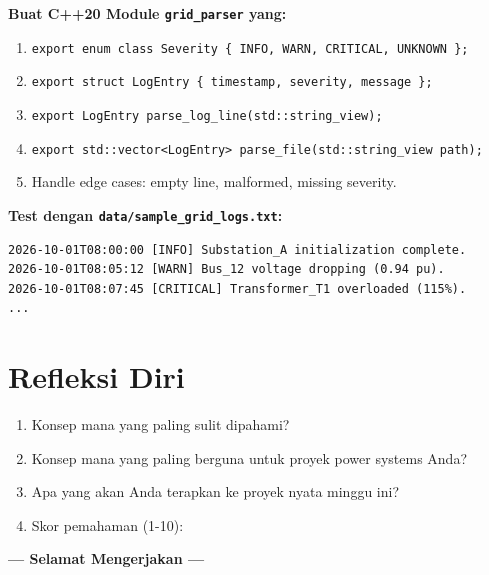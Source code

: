 \documentclass[12pt,a4paper]{article}
\begin{document}
\vspace{0.5cm}

\begin{tcolorbox}[colback=UBgold!10, colframe=UBgold, title=\textbf{E2. Creative: Log Parser Module (C6: Create)}]
\textbf{Buat C++20 Module \texttt{grid\_parser} yang:}

\begin{enumerate}
  \item \texttt{export enum class Severity \{ INFO, WARN, CRITICAL, UNKNOWN \};}
  \item \texttt{export struct LogEntry \{ timestamp, severity, message \};}
  \item \texttt{export LogEntry parse\_log\_line(std::string\_view);}
  \item \texttt{export std::vector<LogEntry> parse\_file(std::string\_view path);}
  \item Handle edge cases: empty line, malformed, missing severity.
\end{enumerate}

\textbf{Test dengan \texttt{data/sample\_grid\_logs.txt}:}

\begin{lstlisting}
2026-10-01T08:00:00 [INFO] Substation_A initialization complete.
2026-10-01T08:05:12 [WARN] Bus_12 voltage dropping (0.94 pu).
2026-10-01T08:07:45 [CRITICAL] Transformer_T1 overloaded (115%).
...
\end{lstlisting}
\end{tcolorbox}

\section*{Refleksi Diri}

\begin{tcolorbox}[colback=blue!5, colframe=blue, title=\textbf{Refleksi Fase 1}]
\begin{enumerate}[label=\arabic*.]
  \item Konsep mana yang paling sulit dipahami? \underline{\hspace{8cm}}
  
  \item Konsep mana yang paling berguna untuk proyek power systems Anda? \underline{\hspace{8cm}}
  
  \item Apa yang akan Anda terapkan ke proyek nyata minggu ini? \underline{\hspace{8cm}}
  
  \item Skor pemahaman (1-10): \underline{\hspace{1cm}}
\end{enumerate}
\end{tcolorbox}

\vspace{1cm}
\begin{center}
\textbf{\large --- Selamat Mengerjakan ---}
\end{center}
\end{document}
